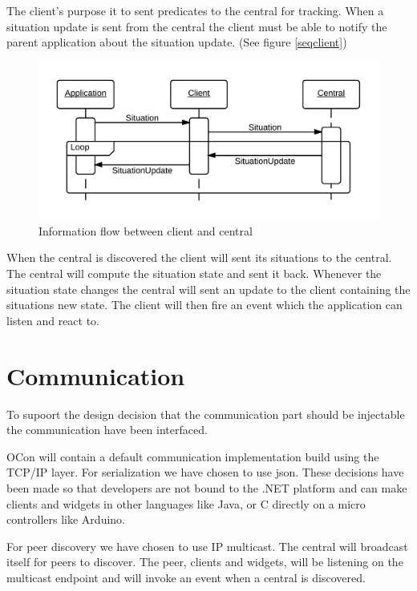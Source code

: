 \documentclass[../report.tex]{subfiles}
\begin{document}
The client's purpose it to sent predicates to the central for tracking. When a situation update is sent from the central the client must be able to notify the parent application about the situation update. (See figure \ref{seqclient})

\begin{figure}[h]
\centering
\includegraphics[width=\linewidth]{clientsequencediagram.png}
\caption{Information flow between client and central}
\label{fig:seqclient}
\end{figure}

When the central is discovered the client will sent its situations to the central. The central will compute the situation state and sent it back. Whenever the situation state changes the central will sent an update to the client containing the situations new state. The client will then fire an event which the application can listen and react to.

\section{Communication}

To supoort the design decision that the communication part should be injectable the communication have been interfaced.

OCon will contain a default communication implementation build using the TCP/IP layer. For serialization we have chosen to use json. These decisions have been made so that developers are not bound to the .NET platform and can make clients and widgets in other languages like Java, or C directly on a micro controllers like Arduino.

For peer discovery we have chosen to use IP multicast. The central will broadcast itself for peers to discover. The peer, clients and widgets, will be listening on the multicast endpoint and will invoke an event when a central is discovered.
\end{document}
